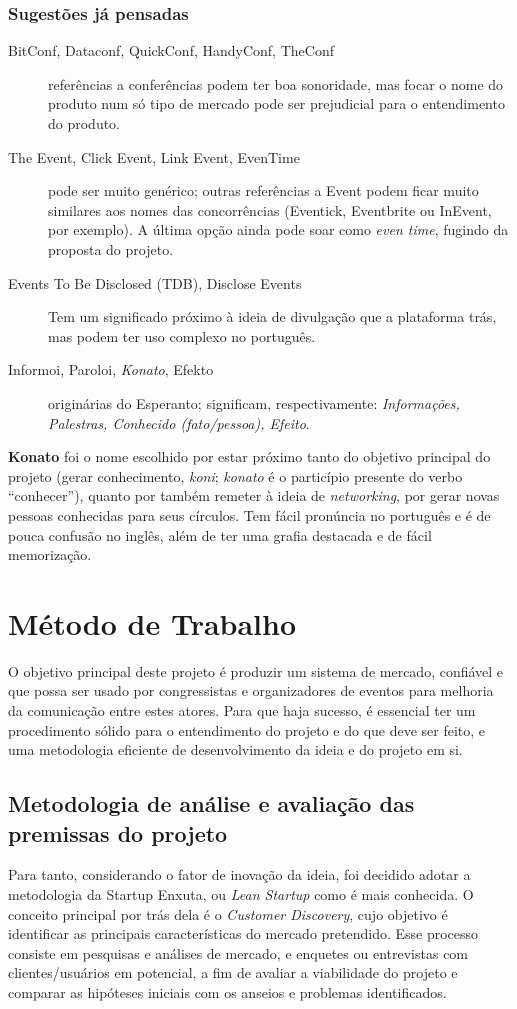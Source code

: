 \documentclass[12pt,a4paper,twoside,hyphens,english,brazil]{abntex2}
\begin{document}
\subsubsection*{Sugestões já pensadas}
\begin{description}
	\item[BitConf, Dataconf, QuickConf, HandyConf, TheConf] referências a conferências podem ter boa sonoridade, mas focar o nome do produto num só tipo de mercado pode ser prejudicial para o entendimento do produto.
	\item[The Event, Click Event, Link Event, EvenTime] pode ser muito genérico; outras referências a Event podem ficar muito similares aos nomes das concorrências (Eventick, Eventbrite ou InEvent, por exemplo). A última opção ainda pode soar como \emph{even time}, fugindo da proposta do projeto.
	\item[Events To Be Disclosed (TDB), Disclose Events] Tem um significado próximo à ideia de divulgação que a plataforma trás, mas podem ter uso complexo no português.
	\item[Informoi, Paroloi, \emph{Konato}, Efekto] originárias do Esperanto; significam, respectivamente: \emph{Informações, Palestras, Conhecido (fato/pessoa), Efeito}.
\end{description}

\textbf{Konato} foi o nome escolhido por estar próximo tanto do objetivo principal do projeto (gerar conhecimento, \emph{koni}; \emph{konato} é o particípio presente do verbo ``conhecer''), quanto por também remeter à ideia de \emph{networking}, por gerar novas pessoas conhecidas para seus círculos. Tem fácil pronúncia no português e é de pouca confusão no inglês, além de ter uma grafia destacada e de fácil memorização.


\section{Método de Trabalho}
O objetivo principal deste projeto é produzir um sistema de mercado, confiável e que possa ser usado por congressistas e organizadores de eventos para melhoria da comunicação entre estes atores. Para que haja sucesso, é essencial ter um procedimento sólido para o entendimento do projeto e do que deve ser feito, e uma metodologia eficiente de desenvolvimento da ideia e do projeto em si.

\subsection{Metodologia de análise e avaliação das premissas do projeto}
Para tanto, considerando o fator de inovação da ideia, foi decidido adotar a metodologia da Startup Enxuta, ou \emph{Lean Startup} como é mais conhecida. O conceito principal por trás dela é o \emph{Customer Discovery}\cite{manual-startup}, cujo objetivo é identificar as principais características do mercado pretendido. Esse processo consiste em pesquisas e análises de mercado, e enquetes ou entrevistas com clientes/usuários em potencial, a fim de avaliar a viabilidade do projeto e comparar as hipóteses iniciais com os anseios e problemas identificados.
\end{document}
